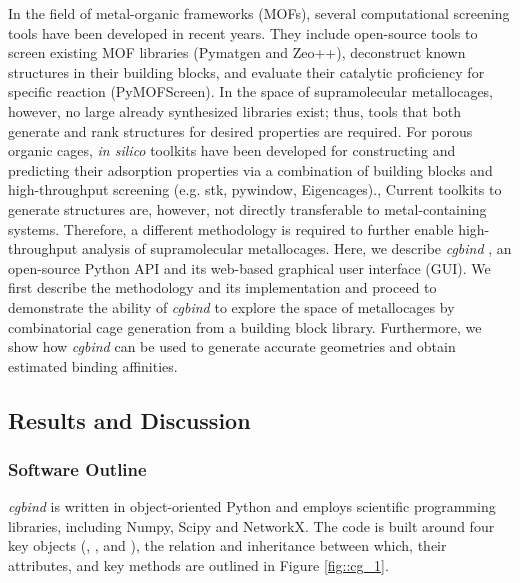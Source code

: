 \documentclass[../../main.tex]{subfiles}
\newcommand{\cgbind}{\emph{cgbind }}
\begin{document}
In the field of metal-organic frameworks (MOFs), several computational screening tools have been developed in recent years.\cite{Wilmer2012, Simon2015} They include open-source tools to screen existing MOF libraries (Pymatgen\cite{Ong2013} and Zeo++\cite{Willems2012}), deconstruct known structures in their building blocks,\cite{Bucior2019} and evaluate their catalytic proficiency for specific reaction (PyMOFScreen\cite{Rosen2019}). In the space of supramolecular metallocages, however, no large already synthesized libraries exist; thus, tools that both generate and rank structures for desired properties are required. For porous organic cages, \emph{in silico} toolkits have been developed for constructing and predicting their adsorption properties via a combination of building blocks and high-throughput screening (e.g. stk, pywindow, Eigencages).\cite{Greenaway2018, Miklitz2017, Turcani2018, Sturluson2018, Kravchenko2020, Miklitz2018}, Current toolkits to generate structures are, however, not directly transferable to metal-containing systems. Therefore, a different methodology is required to further enable high-throughput analysis of supramolecular metallocages.
Here, we describe \cgbind, an open-source Python API and its web-based graphical user interface (GUI). We first describe the methodology and its implementation and proceed to demonstrate the ability of \cgbind to explore the space of metallocages by combinatorial cage generation from a building block library. Furthermore, we show how \cgbind can be used to generate accurate geometries and obtain estimated binding affinities.



\subsection{Results and Discussion}

\subsubsection{Software Outline}

 \cgbind is written in object-oriented Python and employs scientific programming libraries, including Numpy, Scipy and NetworkX.\cite{Numpy, SciPy} The code is built around four key objects (, ,  and ), the relation and inheritance between which, their attributes, and key methods are outlined in Figure \ref{fig::cg_1}. 
\end{document}

